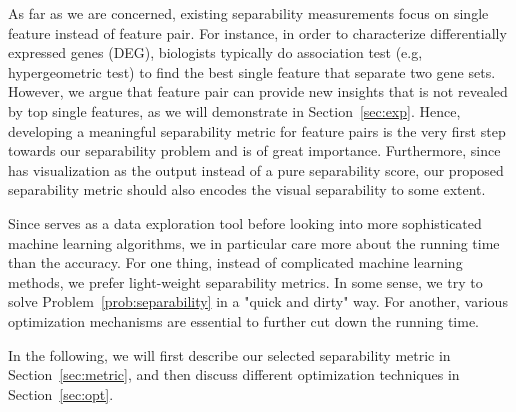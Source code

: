  As far as we are concerned, existing separability measurements focus on single feature instead of feature pair. For instance, in order to characterize differentially expressed genes (DEG), biologists typically do association test (e.g, hypergeometric test) to find the best single feature that separate two gene sets. However, we argue that feature pair can provide new insights that is not revealed by top single features, as we will demonstrate in Section~\ref{sec:exp}. Hence, developing a meaningful separability metric for feature pairs is the very first step towards our separability problem and is of great importance. Furthermore, since \genviz has visualization as the output instead of a pure separability score, our proposed separability metric should also encodes the visual separability to some extent. 

 Since \genviz serves as a data exploration tool before looking into more sophisticated machine learning algorithms, we in particular care more about the running time than the accuracy. For one thing, instead of complicated machine learning methods, we prefer light-weight separability metrics. In some sense, we try to solve Problem~\ref{prob:separability} in a "quick and dirty" way. For another, various optimization mechanisms are essential to further cut down the running time.

In the following, we will first describe our selected separability metric in Section~\ref{sec:metric}, and then discuss different optimization techniques in Section~\ref{sec:opt}.

